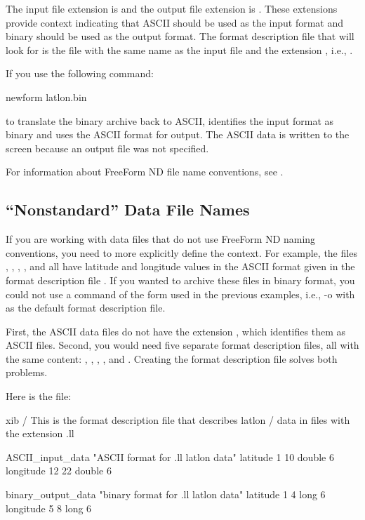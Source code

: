 The input file extension is  and the output file extension
is . These extensions provide context indicating that ASCII
should be used as the input format and binary should be used as the
output format. The format description file that  will
look for is the file with the same name as the input file and the
extension , i.e., .

If you use the following command: 

\begin{example}
newform latlon.bin 
\end{example}

to translate the binary archive  back to ASCII,
 identifies the input format as binary and uses the ASCII
format for output. The ASCII data is written to the screen because an
output file was not specified.

For information about FreeForm ND file name conventions, see
.

\subsection{``Nonstandard'' Data File Names}

If you are working with data files that do not use FreeForm ND naming
conventions, you need to more explicitly define the context. For
example, the files , , ,
, and  all have latitude and longitude
values in the ASCII format given in the format description file
. If you wanted to archive these files in binary
format, you could not use a command of the form used in the previous
examples, i.e.,   -o 
with  as the default format description file.

First, the ASCII data files do not have the extension ,
which identifies them as ASCII files. Second, you would need five
separate format description files, all with the same content:
, , ,
, and . Creating the format
description file  solves both problems.

Here is the  file:

\nopagebreak
\begin{vcode}{xib}
/ This is the format description file that describes latlon
/ data in files with the extension .ll

ASCII_input_data "ASCII format for .ll latlon data"
latitude 1 10 double 6
longitude 12 22 double 6

binary_output_data "binary format for .ll latlon data"
latitude 1 4 long 6
longitude 5 8 long 6 
\end{vcode}


